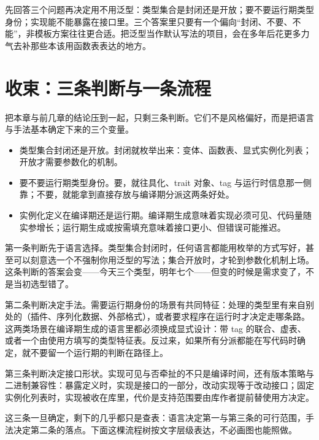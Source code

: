 \documentclass[12pt,a4paper,fontset=fandol]{ctexbook}
\begin{document}
\begin{bestpractice}[title={泛型是设计决策，不是默认选项}]
先回答三个问题再决定用不用泛型：类型集合是封闭还是开放；要不要运行期类型身份；实现能不能暴露在接口里。三个答案里只要有一个偏向“封闭、不要、不能”，非模板方案往往更合适。把泛型当作默认写法的项目，会在多年后花更多力气去补那些本该用函数表表达的地方。
\end{bestpractice}

\section{收束：三条判断与一条流程}

把本章与前几章的结论压到一起，只剩三条判断。它们不是风格偏好，而是把语言与手法基本确定下来的三个变量。

\begin{guideline}[title={决定方案的三条判断}]
\begin{itemize}
\item 类型集合封闭还是开放。封闭就枚举出来：变体、函数表、显式实例化列表；开放才需要参数化的机制。
\item 要不要运行期类型身份。要，就往具化、trait 对象、tag 与运行时信息那一侧靠；不要，就能拿到直接存放与编译期分派这两条好处。
\item 实例化定义在编译期还是运行期。编译期生成意味着实现必须可见、代码量随实参增长；运行期生成或按需填充意味着接口更小、但错误可能推迟。
\end{itemize}
\end{guideline}

第一条判断先于语言选择。类型集合封闭时，任何语言都能用枚举的方式写好，甚至可以刻意选一个不强制你用泛型的写法；集合开放时，才轮到参数化机制上场。这条判断的答案会变——今天三个类型，明年七个——但变的时候是需求变了，不是当初选型错了。

第二条判断决定手法。需要运行期身份的场景有共同特征：处理的类型里有来自别处的（插件、序列化数据、外部格式），或者要求程序在运行时才决定走哪条路。这两类场景在编译期生成的语言里都必须换成显式设计：带 tag 的联合、虚表、或者一个由使用方填写的类型特征表。反过来，如果所有分派都能在写代码时确定，就不要留一个运行期的判断在路径上。

第三条判断决定接口形状。实现可见与否牵扯的不只是编译时间，还有版本策略与二进制兼容性：暴露定义时，实现是接口的一部分，改动实现等于改动接口；固定实例化列表时，实现被收在库里，代价是支持范围要由库作者提前替使用方决定。

这三条一旦确定，剩下的几乎都只是查表：语言决定第一与第三条的可行范围，手法决定第二条的落点。下面这棵流程树按文字层级表达，不必画图也能照做。
\end{document}
